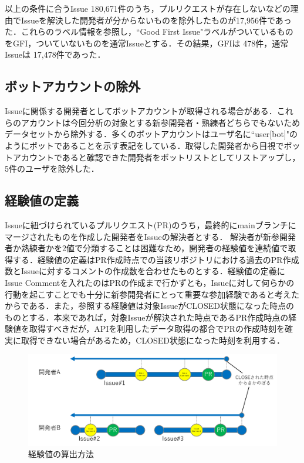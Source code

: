 \documentclass[11pt]{jreport}
\newcommand{\NIssue}{180,671}
\newcommand{\NTrueIssue}{17,956}
\newcommand{\NGFI}{478}
\newcommand{\NNormal}{17,478}
\newcommand{\NBOT}{5}
\begin{document}
以上の条件に合うIssue \NIssue 件のうち，プルリクエストが存在しないなどの理由でIssueを解決した開発者が分からないものを除外したものが\NTrueIssue 件であった．これらのラベル情報を参照し，``Good First Issue"ラベルがついているものをGFI，ついていないものを通常Issueとする．その結果，GFIは \NGFI 件，通常Issueは \NNormal 件であった．

\subsection{ボットアカウントの除外}
Issueに関係する開発者としてボットアカウントが取得される場合がある．これらのアカウントは今回分析の対象とする新参開発者・熟練者どちらでもないためデータセットから除外する．多くのボットアカウントはユーザ名に``user[bot]"のようにボットであることを示す表記をしている．取得した開発者から目視でボットアカウントであると確認できた開発者をボットリストとしてリストアップし，\NBOT 件のユーザを除外した．

\subsection{経験値の定義}
Issueに紐づけられているプルリクエスト(PR)のうち，最終的にmainブランチにマージされたものを作成した開発者をIssueの解決者とする．
解決者が新参開発者か熟練者かを2値で分類することは困難なため，開発者の経験値を連続値で取得する．経験値の定義はPR作成時点での当該リポジトリにおける過去のPR作成数とIssueに対するコメントの作成数を合わせたものとする．経験値の定義にIssue Commentを入れたのはPRの作成まで行かずとも，Issueに対して何らかの行動を起こすことでも十分に新参開発者にとって重要な参加経験であると考えたからである．また，参照する経験値は対象IssueがCLOSED状態になった時点のものとする．本来であれば，対象Issueが解決された時点であるPR作成時点の経験値を取得すべきだが，APIを利用したデータ取得の都合でPRの作成時刻を確実に取得できない場合があるため，CLOSED状態になった時刻を利用する．

\begin{figure}[t]
\centerline{\includegraphics[width=0.9\linewidth]{@BSthesis2024_Nakai/BSthesis2024_Nakai_fig/exp.png}}
\caption{経験値の算出方法}
\label{fig:milestone}
\end{figure}
\end{document}
